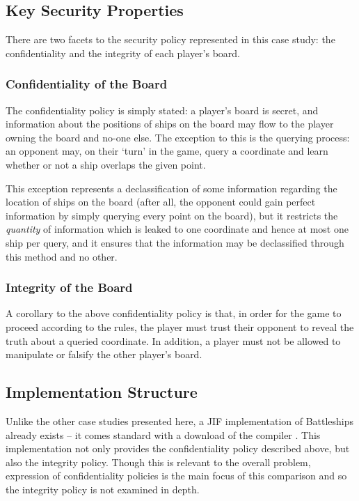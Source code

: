 \newpage

\subsection{Key Security Properties}

There are two facets to the security policy represented in this case study: the confidentiality and the integrity of each player's board.

\subsubsection{Confidentiality of the Board}

The confidentiality policy is simply stated: a player's board is secret, and information about the positions of ships on the board may flow to the player owning the board and no-one else. The exception to this is the querying process: an opponent may, on their `turn' in the game, query a coordinate and learn whether or not a ship overlaps the given point.

This exception represents a declassification of some information regarding the location of ships on the board (after all, the opponent could gain perfect information by simply querying every point on the board), but it restricts the \textit{quantity} of information which is leaked to one coordinate and hence at most one ship per query, and it ensures that the information may be declassified through this method and no other.

\subsubsection{Integrity of the Board}

A corollary to the above confidentiality policy is that, in order for the game to proceed according to the rules, the player must trust their opponent to reveal the truth about a queried coordinate. In addition, a player must not be allowed to manipulate or falsify the other player's board.

\subsection{Implementation Structure}\label{battleships_impstructure}

Unlike the other case studies presented here, a JIF implementation of Battleships already exists -- it comes standard with a download of the compiler \cite{jifwebsite}. This implementation not only provides the confidentiality policy described above, but also the integrity policy. Though this is relevant to the overall problem, expression of confidentiality policies is the main focus of this comparison and so the integrity policy is not examined in depth.

